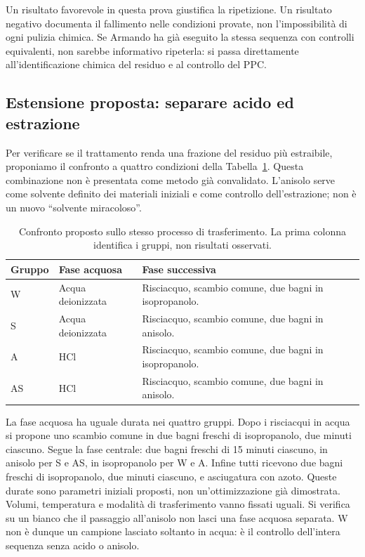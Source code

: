 \documentclass[11pt,reqno]{amsart}
\numberwithin{equation}{section}
\begin{document}
Un risultato favorevole in questa prova giustifica la ripetizione.
Un risultato negativo documenta il fallimento nelle condizioni provate,
non l'impossibilit\`a di ogni pulizia chimica. Se Armando ha gi\`a
eseguito la stessa sequenza con controlli equivalenti, non sarebbe
informativo ripeterla: si passa direttamente all'identificazione
chimica del residuo e al controllo del PPC.

\subsection{Estensione proposta: separare acido ed estrazione}
Per verificare se il trattamento renda una frazione del residuo pi\`u
estraibile, proponiamo il confronto a quattro condizioni della
Tabella~\ref{tab:design}. Questa combinazione non \`e presentata come
metodo gi\`a convalidato. L'anisolo serve come solvente definito dei
materiali iniziali e come controllo dell'estrazione; non \`e un nuovo
``solvente miracoloso''.

\begin{table}[htbp]
\caption{Confronto proposto sullo stesso processo di trasferimento.
La prima colonna identifica i gruppi, non risultati osservati.}
\label{tab:design}
\centering
\small
\begin{tabular}{@{}p{}p{}p{}@{}}
\toprule
Gruppo & Fase acquosa & Fase successiva \\
\midrule
W & Acqua deionizzata & Risciacquo, scambio comune, due bagni in isopropanolo. \\[4pt]
S & Acqua deionizzata & Risciacquo, scambio comune, due bagni in anisolo. \\[4pt]
A & HCl & Risciacquo, scambio comune, due bagni in isopropanolo. \\[4pt]
AS & HCl & Risciacquo, scambio comune, due bagni in anisolo. \\
\bottomrule
\end{tabular}
\end{table}

La fase acquosa ha uguale durata nei quattro gruppi. Dopo i risciacqui
in acqua si propone uno scambio comune in due bagni freschi di
isopropanolo, due minuti ciascuno. Segue la fase centrale: due bagni
freschi di 15 minuti ciascuno, in anisolo per S e AS, in isopropanolo
per W e A. Infine tutti ricevono due bagni freschi di isopropanolo,
due minuti ciascuno, e asciugatura con azoto. Queste durate sono
parametri iniziali proposti, non un'ottimizzazione gi\`a dimostrata.
Volumi, temperatura e modalit\`a di trasferimento vanno fissati uguali.
Si verifica su un bianco che il passaggio all'anisolo non lasci una
fase acquosa separata. W non \`e dunque un campione lasciato soltanto
in acqua: \`e il controllo dell'intera sequenza senza acido o anisolo.
\end{document}
